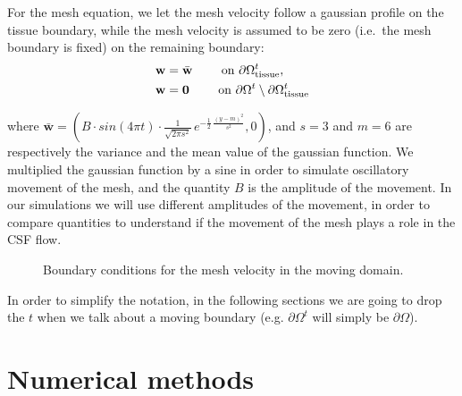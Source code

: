\documentclass[a4paper,11pt,openright,twoside]{book}
\begin{document}
For the mesh equation, we let the mesh velocity follow a gaussian profile on the tissue boundary, while the mesh velocity is assumed to
be zero (i.e.~the mesh boundary is fixed) on the remaining boundary:
\begin{align}
\label{eq:bc:5}
\mathbf{w} &= \bar{\mathbf{w}}  \qquad \text{ on } \partial \Omega_{\rm tissue}^t,\\
\mathbf{w} &= \mathbf{0}  \qquad \text{ on } \partial \Omega^t \setminus \partial \Omega_{\rm tissue}^t
\end{align}

where $\bar{\mathbf{w}} = (B \cdot sin(4\pi t) \cdot \frac{1}{\sqrt{2 \pi s^2}} \, e^{- \frac{1}{2} \, \frac{(y - m)^2}{s^2}}  , 0)$, and $s = 3$ and $m = 6$ are respectively the variance and the mean value of the gaussian function. We multiplied the gaussian function by a sine in order to simulate oscillatory movement of the mesh, and the quantity $B$ is the amplitude of the movement. In our simulations we will use different amplitudes of the movement, in order to compare quantities to understand if the movement of the mesh plays a role in the CSF flow.

\begin{figure}[h!]
\centering
{}
\caption{Boundary conditions for the mesh velocity in the moving domain.}
\label{img:cns:5}
\end{figure}


In order to simplify the notation, in the following sections we are going to drop the $t$ when we talk about a moving boundary (e.g. $\partial \Omega^t$ will simply be $\partial \Omega$).




\chapter{Numerical methods}
\end{document}
